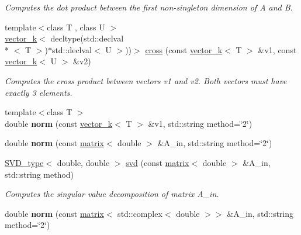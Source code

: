 \begin{DoxyCompactItemize}
\begin{DoxyCompactList}\small\item\em Computes the dot product between the first non-\/singleton dimension of A and B. \end{DoxyCompactList}\item 
\hypertarget{namespacekeycpp_aa590a6946f71f4c1b2e575bdb791f00f}{{\footnotesize template$<$class T , class U $>$ }\\\hyperlink{classkeycpp_1_1vector__k}{vector\-\_\-k}$<$ decltype(std\-::declval\\*
$<$ T $>$)$\ast$std\-::declval$<$ U $>$))$>$ \hyperlink{namespacekeycpp_aa590a6946f71f4c1b2e575bdb791f00f}{cross} (const \hyperlink{classkeycpp_1_1vector__k}{vector\-\_\-k}$<$ T $>$ \&v1, const \hyperlink{classkeycpp_1_1vector__k}{vector\-\_\-k}$<$ U $>$ \&v2)}\label{namespacekeycpp_aa590a6946f71f4c1b2e575bdb791f00f}

\begin{DoxyCompactList}\small\item\em Computes the cross product between vectors v1 and v2. Both vectors must have exactly 3 elements. \end{DoxyCompactList}\item 
\hypertarget{namespacekeycpp_a78ea0301dbb858bbfdf2646a857a1ec6}{{\footnotesize template$<$class T $>$ }\\double {\bfseries norm} (const \hyperlink{classkeycpp_1_1vector__k}{vector\-\_\-k}$<$ T $>$ \&v1, std\-::string method=\char`\"{}2\char`\"{})}\label{namespacekeycpp_a78ea0301dbb858bbfdf2646a857a1ec6}

\item 
\hypertarget{namespacekeycpp_aeb34bdd249af3ce92341cdda62f95f65}{double {\bfseries norm} (const \hyperlink{classkeycpp_1_1matrix}{matrix}$<$ double $>$ \&A\-\_\-in, std\-::string method=\char`\"{}2\char`\"{})}\label{namespacekeycpp_aeb34bdd249af3ce92341cdda62f95f65}

\item 
\hypertarget{namespacekeycpp_a838fc93d66e1ab63d68d04781086d81a}{\hyperlink{classkeycpp_1_1_s_v_d__type}{S\-V\-D\-\_\-type}$<$ double, double $>$ \hyperlink{namespacekeycpp_a838fc93d66e1ab63d68d04781086d81a}{svd} (const \hyperlink{classkeycpp_1_1matrix}{matrix}$<$ double $>$ \&A\-\_\-in, std\-::string method)}\label{namespacekeycpp_a838fc93d66e1ab63d68d04781086d81a}

\begin{DoxyCompactList}\small\item\em Computes the singular value decomposition of matrix A\-\_\-in. \end{DoxyCompactList}\item 
\hypertarget{namespacekeycpp_ad211ab5ae14ac9710265c662f70f20ff}{double {\bfseries norm} (const \hyperlink{classkeycpp_1_1matrix}{matrix}$<$ std\-::complex$<$ double $>$$>$ \&A\-\_\-in, std\-::string method=\char`\"{}2\char`\"{})}\label{namespacekeycpp_ad211ab5ae14ac9710265c662f70f20ff}


\end{DoxyCompactItemize}
